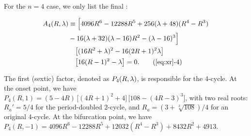 \documentclass{ws-ijbc}
\begin{document}
For the $n = 4$ case,
%
we only list the final : %
%
\begin{small}
\begin{align}
A_4\Rlam
& \equiv
    \Big[
    4096 R^6-12288 R^5 +
    256 (\lambda + 48) (R^4 - R^3) \notag \\
& -16 (\lambda + 32)(\lambda - 16) R^2
      -(\lambda - 16)^3 \Big] \notag \\
& \quad
    \big[(16 R^2 + \lambda)^2 - 16 (2R+1)^2 \lambda \big] \notag \\
& \quad
    \big[ 16 (R-1)^2 - \lambda \big]
 = 0.
\tag{\ref{eq:xr}-4}
\label{eq:xr4}
\end{align}
\end{small}
%
%
%
The first (sextic) factor, denoted as $P_4(R, \lambda)$,
  is responsible for the 4-cycle.
%
At the onset point, %
we have %
$ P_4(R, 1)
= (
    5 - 4R
  )
\, \big[
  (4R + 1)^2 + 4
  \big]
\, \big[
  108 - (4R - 3)^3
  \big]$,
%
%
%
with two real roots:
$R_a' = 5/4$
for the period-doubled 2-cycle,
and
$R_a = (3+\sqrt[3]{108})/4$
for an original 4-cycle. %
%
At the bifurcation point, %
we have $P_4(R, -1)
 = 4096 R^6 - 12288 R^5 + 12032 (R^4 - R^3)
  + 8432 R^2 + 4913$.
%
%
\end{document}
